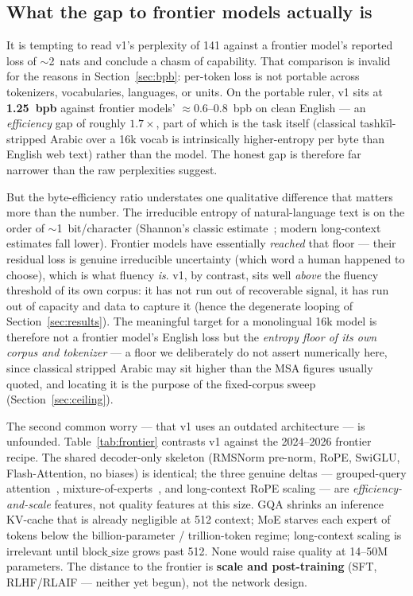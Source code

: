 \documentclass[10pt,twocolumn]{article}
\begin{document}
\subsection{What the gap to frontier models actually is}
\label{sec:gap}
It is tempting to read v1's perplexity of 141 against a frontier model's
reported loss of $\sim$2~nats and conclude a chasm of capability. That
comparison is invalid for the reasons in Section~\ref{sec:bpb}: per-token loss
is not portable across tokenizers, vocabularies, languages, or units. On the
portable ruler, v1 sits at \textbf{1.25~bpb} against frontier models'
$\approx$0.6--0.8~bpb on clean English --- an \emph{efficiency} gap of roughly
$1.7\times$, part of which is the task itself (classical tashk\=il-stripped
Arabic over a 16k vocab is intrinsically higher-entropy per byte than English
web text) rather than the model. The honest gap is therefore far narrower than
the raw perplexities suggest.

But the byte-efficiency ratio understates one qualitative difference that
matters more than the number. The irreducible entropy of natural-language text
is on the order of $\sim$1~bit/character (Shannon's classic
estimate~\cite{shannon1951}; modern long-context estimates fall lower).
Frontier models have essentially \emph{reached} that floor --- their residual
loss is genuine irreducible uncertainty (which word a human happened to choose),
which is what fluency \emph{is}. v1, by contrast, sits well \emph{above} the
fluency threshold of its own corpus: it has not run out of recoverable signal,
it has run out of capacity and data to capture it (hence the degenerate looping
of Section~\ref{sec:results}). The meaningful target for a monolingual 16k model
is therefore not a frontier model's English loss but the \emph{entropy floor of
its own corpus and tokenizer} --- a floor we deliberately do not assert
numerically here, since classical stripped Arabic may sit higher than the MSA
figures usually quoted, and locating it is the purpose of the fixed-corpus sweep
(Section~\ref{sec:ceiling}).

The second common worry --- that v1 uses an outdated architecture --- is
unfounded. Table~\ref{tab:frontier} contrasts v1 against the 2024--2026 frontier
recipe. The shared decoder-only skeleton (RMSNorm pre-norm, RoPE, SwiGLU,
Flash-Attention, no biases) is identical; the three genuine deltas ---
grouped-query attention~\cite{gqa}, mixture-of-experts~\cite{mixtral}, and
long-context RoPE scaling --- are \emph{efficiency-and-scale} features, not
quality features at this size. GQA shrinks an inference KV-cache that is already
negligible at 512 context; MoE starves each expert of tokens below the
billion-parameter / trillion-token regime; long-context scaling is irrelevant
until $\text{block\_size}$ grows past 512. None would raise quality at 14--50M
parameters. The distance to the frontier is \textbf{scale and post-training}
(SFT, RLHF/RLAIF --- neither yet begun), not the network design.
\end{document}
